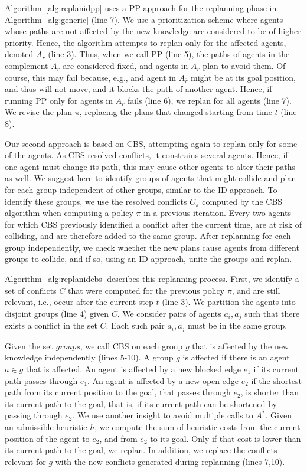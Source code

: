 \documentclass[letterpaper]{article} %
\def\
UrlFont{\rm}  %
\theoremstyle{definition}
\begin{document}
Algorithm~\ref{alg:replanidpp} uses a PP approach for the replanning phase in Algorithm~\ref{alg:generic} (line 7). We use a prioritization scheme where agents whose paths are not affected by the new knowledge are considered to be of higher priority. Hence, the algorithm attempts to replan only for the affected agents, denoted $A_r$ (line 3). Thus, when we call PP (line 5), the paths of agents in the complement $A_{\overline{r}}$ are considered fixed, and agents in $A_r$ plan to avoid them. Of course, this may fail because, e.g., and agent in $A_{\overline{r}}$ might be at its goal position, and thus will not move, and it blocks the path of another agent. Hence, if running PP only for agents in $A_r$ fails (line 6), we replan for all agents (line 7). We revise the plan $\pi$, replacing the plans that changed starting from time $t$ (line 8).

Our second approach is based on CBS, attempting again to replan only for some of the agents. As CBS resolved conflicts, it constrains several agents. Hence, if one agent must change its path, this may cause other agents to alter their paths as well.
We suggest here to identify groups of agents that might collide and plan for each group independent of other groups, similar to the ID approach. To identify these groups, we use the resolved conflicts $C_\pi$ computed by the CBS algorithm when computing a policy $\pi$ in a previous iteration. Every two agents for which CBS previously identified a conflict after the current time, are at risk of colliding, and are therefore added to the same group.
After replanning for each group independently, we check whether the new plans cause agents from different groups to collide, and if so, using an ID approach, unite the groups and replan.

Algorithm~\ref{alg:replanidcbs} describes this replanning process. First, we identify a set of conflicts $C$ that were computed for the previous policy $\pi$, and are still relevant, i.e., occur after the current step $t$ (line 3). We partition the agents into disjoint groups (line 4) given $C$. We consider pairs of agents $a_i,a_j$ such that there exists a conflict in the set $C$. Each such pair $a_i,a_j$ must be in the same group.

Given the set $groups$, we call CBS on each group $g$ that is affected by the new knowledge independently (lines 5-10). A group $g$ is affected if there is an agent $a \in g$ that is affected. An agent is affected by a new blocked edge $e_1$ if its current path passes through $e_1$. An agent is affected by a new open edge $e_2$ if the shortest path from its current position to the goal, that passes through $e_2$, is shorter than its current path to the goal, that is, if its current path can be shortened by passing through $e_2$. We use another insight to avoid multiple calls to $A^*$. Given an admissible heuristic $h$, we compute the sum of heuristic costs from the current position of the agent to $e_2$, and from $e_2$ to its goal. Only if that cost is lower than its current path to the goal, we replan. In addition, we replace the conflicts relevant for $g$ with the new conflicts generated during replanning (lines 7,10).
\end{document}

